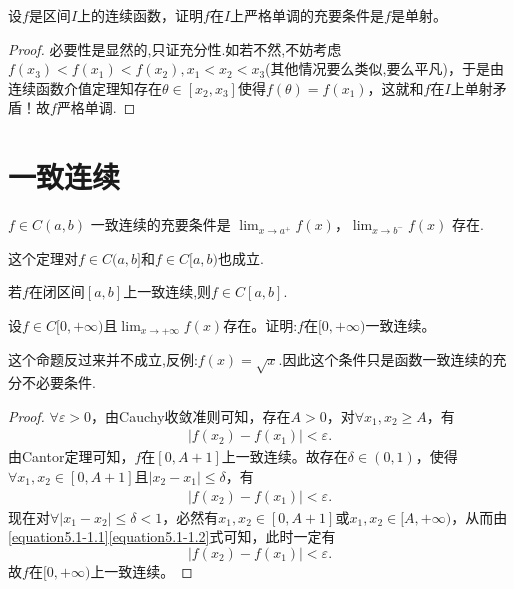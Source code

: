 \documentclass[lang=cn,newtx,10pt,scheme=chinese]{elegantbook}
\begin{document}
\begin{proposition}[连续单射等价严格单调]\label{proposition:连续单射等价严格单调}
设\(f\)是区间\(I\)上的连续函数，证明\(f\)在\(I\)上严格单调的充要条件是\(f\)是单射。
\end{proposition}
\begin{proof}
必要性是显然的,只证充分性.如若不然,不妨考虑\(f(x_3)<f(x_1)<f(x_2),x_1<x_2<x_3\)(其他情况要么类似,要么平凡)，于是由连续函数介值定理知存在\(\theta\in[x_2,x_3]\)使得\(f(\theta)=f(x_1)\)，这就和\(f\)在\(I\)上单射矛盾！故\(f\)严格单调.
\end{proof}














\section{一致连续}

\begin{theorem}[Cantor定理]\label{theorem:Cantor定理}
   \(f\in C(a,b)\) 一致连续的充要条件是 \(\lim_{x\rightarrow a^{+}}f(x)\)，\(\lim_{x\rightarrow b^{-}}f(x)\) 存在.
\end{theorem}
\begin{remark}
   这个定理对$f\in C(a,b]$和$f\in C[a,b)$也成立.
\end{remark}

\begin{corollary}\label{corollary:闭区间上的连续函数一定一致连续.}
   若$f$在闭区间$[a,b]$上一致连续,则$f\in C[a,b]$.
\end{corollary}

\begin{proposition}\label{proposition一致连续的充分不必要条件}
   设\(f\in C[0,+\infty)\)且\(\lim_{x\rightarrow +\infty}f(x)\)存在。证明:\(f\)在\([0,+\infty)\)一致连续。
\end{proposition}
\begin{remark}
   这个命题反过来并不成立,反例:$f(x)=\sqrt{x}$.因此这个条件只是函数一致连续的充分不必要条件.
\end{remark}
\begin{proof}
   \(\forall \varepsilon > 0\)，由Cauchy收敛准则可知，存在\(A > 0\)，对\(\forall x_1, x_2 \geqslant A\)，有
\begin{align}
  \left| f(x_2) - f(x_1) \right| < \varepsilon.  \label{equation5.1-1.1}
\end{align}
由Cantor定理可知，\(f\)在\([0, A + 1]\)上一致连续。故存在\(\delta \in (0, 1)\)，使得\(\forall x_1, x_2 \in [0, A + 1]\)且\(\left| x_2 - x_1 \right| \leqslant \delta\)，有
\begin{align}
   \left| f(x_2) - f(x_1) \right| < \varepsilon.\label{equation5.1-1.2}
\end{align}
现在对\(\forall \left| x_1 - x_2 \right| \leqslant \delta < 1\)，必然有\(x_1, x_2 \in [0, A + 1]\)或\(x_1, x_2 \in [A, +\infty)\)，从而由\eqref{equation5.1-1.1}\eqref{equation5.1-1.2}式可知，此时一定有
\[
\left| f(x_2) - f(x_1) \right| < \varepsilon.
\]
故\(f\)在\([0, +\infty)\)上一致连续。
\end{proof}
\end{document}
